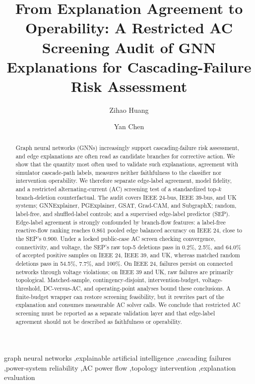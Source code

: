 \documentclass[final,number]{elsarticle}
\begin{document}
\sloppy

\begin{frontmatter}

\title{From Explanation Agreement to Operability: A Restricted AC Screening Audit of GNN Explanations for Cascading-Failure Risk Assessment}

\author[aff1,aff2]{Zihao Huang}
\author[aff1,aff2]{Yan Chen}
\address[aff1]{Guangxi Key Laboratory of Digital Infrastructure, Guangxi Zhuang Autonomous Region Information Center, Nanning 530000, China}
\address[aff2]{School of Computer and Electronic Information, Guangxi University, Nanning 530000, China}

\begin{abstract}
Graph neural networks (GNNs) increasingly support cascading-failure risk assessment, and edge explanations are often read as candidate branches for corrective action. We show that the quantity most often used to validate such explanations, agreement with simulator cascade-path labels, measures neither faithfulness to the classifier nor intervention operability. We therefore separate edge-label agreement, model fidelity, and a restricted alternating-current (AC) screening test of a standardized top-$k$ branch-deletion counterfactual. The audit covers IEEE 24-bus, IEEE 39-bus, and UK systems; GNNExplainer, PGExplainer, GSAT, Grad-CAM, and SubgraphX; random, label-free, and shuffled-label controls; and a supervised edge-label predictor (SEP). Edge-label agreement is strongly confounded by branch-flow features: a label-free reactive-flow ranking reaches 0.861 pooled edge balanced accuracy on IEEE 24, close to the SEP's 0.900. Under a locked public-case AC screen checking convergence, connectivity, and voltage, the SEP's raw top-5 deletions pass in 0.2\%, 2.5\%, and 64.0\% of accepted positive samples on IEEE 24, IEEE 39, and UK, whereas matched random deletions pass in 54.5\%, 7.7\%, and 100\%. On IEEE 24, failures persist on connected networks through voltage violations; on IEEE 39 and UK, raw failures are primarily topological. Matched-sample, contingency-disjoint, intervention-budget, voltage-threshold, DC-versus-AC, and operating-point analyses bound these conclusions. A finite-budget wrapper can restore screening feasibility, but it rewrites part of the explanation and consumes measurable AC solver calls. We conclude that restricted AC screening must be reported as a separate validation layer and that edge-label agreement should not be described as faithfulness or operability.
\end{abstract}

\begin{keyword}
graph neural networks \sep explainable artificial intelligence \sep cascading failures \sep power-system reliability \sep AC power flow \sep topology intervention \sep explanation evaluation
\end{keyword}

\end{frontmatter}





\end{document}

